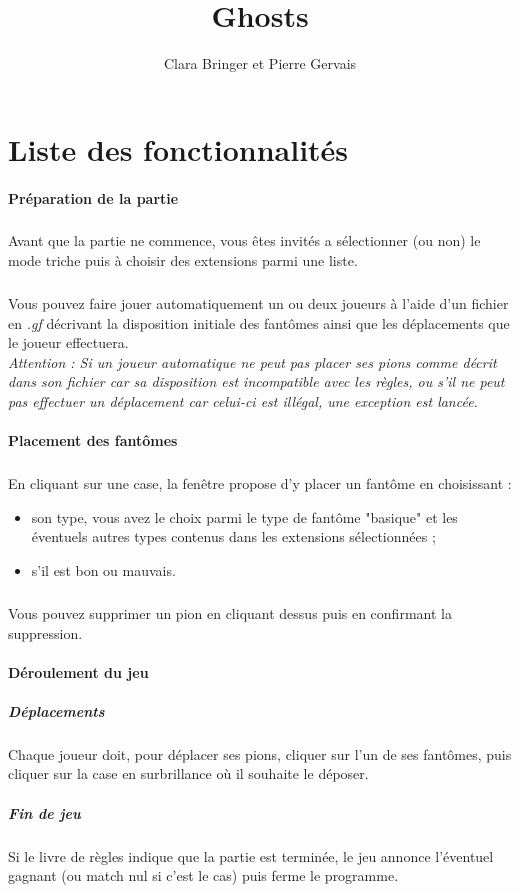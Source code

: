 \documentclass[]{report}
\title{Ghosts}
\author{Clara Bringer et Pierre Gervais}
\begin{document}
\maketitle

\section{Liste des fonctionnalités}

\paragraph{Préparation de la partie}
\subparagraph*{}
Avant que la partie ne commence, vous êtes invités a sélectionner (ou non) le mode triche puis à choisir des extensions parmi une liste.
\subparagraph*{}
Vous pouvez faire jouer automatiquement un ou deux joueurs à l'aide d'un fichier en \textit{.gf} décrivant la disposition initiale des fantômes ainsi que les déplacements que le joueur effectuera.\\
\emph{Attention : Si un joueur automatique ne peut pas placer ses pions comme décrit dans son fichier car sa disposition est incompatible avec les règles, ou s'il ne peut pas effectuer un déplacement car celui-ci est illégal, une exception est lancée.}

\paragraph{Placement des fantômes}
\subparagraph*{}
En cliquant sur une case, la fenêtre propose d'y placer un fantôme en choisissant :
\begin{itemize}
	\item son type, vous avez le choix parmi le type de fantôme "basique" et les éventuels autres types contenus dans les extensions sélectionnées ;
	\item s'il est bon ou mauvais.
\end{itemize}
\subparagraph*{}
Vous pouvez supprimer un pion en cliquant dessus puis en confirmant la suppression.

\paragraph{Déroulement du jeu}
\subparagraph{Déplacements}
Chaque joueur doit, pour déplacer ses pions, cliquer sur l'un de ses fantômes, puis cliquer sur la case en surbrillance où il souhaite le déposer.
\subparagraph{Fin de jeu}
Si le livre de règles indique que la partie est terminée, le jeu annonce l'éventuel gagnant (ou match nul si c'est le cas) puis ferme le programme.
\end{document}
